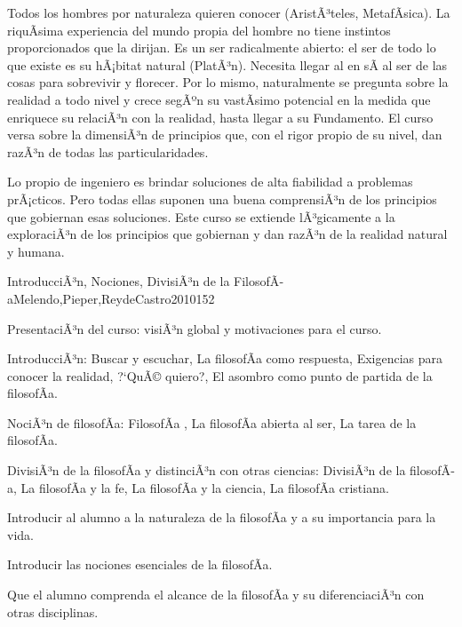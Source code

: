 \begin{syllabus}


\begin{justification}
Todos los hombres por naturaleza quieren conocer  (AristÃ³teles, MetafÃ­sica). La riquÃ­sima experiencia del mundo propia del hombre no tiene instintos proporcionados que la dirijan. Es un ser radicalmente abierto: el ser de todo lo que existe es su  hÃ¡bitat  natural (PlatÃ³n). Necesita llegar al  en sÃ­ al ser de las cosas para sobrevivir y florecer. Por lo mismo, naturalmente se pregunta sobre la realidad a todo nivel y crece segÃºn su vastÃ­simo potencial en la medida que enriquece su relaciÃ³n con la realidad, hasta llegar a su Fundamento. El curso versa sobre la dimensiÃ³n de principios que, con el rigor propio de su nivel, dan razÃ³n de todas las particularidades.
\end{justification}

\begin{goals}
\item Lo propio de ingeniero es brindar soluciones de alta fiabilidad a problemas prÃ¡cticos. Pero todas ellas suponen una buena comprensiÃ³n de los principios que gobiernan esas soluciones. Este curso se extiende lÃ³gicamente a la exploraciÃ³n de los principios que gobiernan y dan razÃ³n de la realidad natural y humana.
\end{goals}

\begin{outcomes}
\end{outcomes}

\begin{unit}{IntroducciÃ³n, Nociones, DivisiÃ³n de la FilosofÃ­a}{Melendo,Pieper,ReydeCastro2010}{15}{2}
\begin{topics}
	\item PresentaciÃ³n del curso: visiÃ³n global y motivaciones para el curso.
	\item IntroducciÃ³n: Buscar y escuchar, La filosofÃ­a como respuesta, Exigencias para conocer la realidad, ?`QuÃ© quiero?, El asombro como punto de partida de la filosofÃ­a.
	\item NociÃ³n de filosofÃ­a:  FilosofÃ­a , La filosofÃ­a abierta al ser, La tarea de la filosofÃ­a.
	\item DivisiÃ³n de la filosofÃ­a y distinciÃ³n con otras ciencias: DivisiÃ³n de la filosofÃ­a, La filosofÃ­a y la fe, La filosofÃ­a y la ciencia,  La filosofÃ­a cristiana.
\end{topics}
\begin{unitgoals}
	\item Introducir al alumno a la naturaleza de la filosofÃ­a y a su importancia para la vida.
	\item Introducir las nociones esenciales de la filosofÃ­a.
	\item Que el alumno comprenda el alcance de la filosofÃ­a y su diferenciaciÃ³n con otras disciplinas.
\end{unitgoals}
\end{unit}


\end{syllabus}
